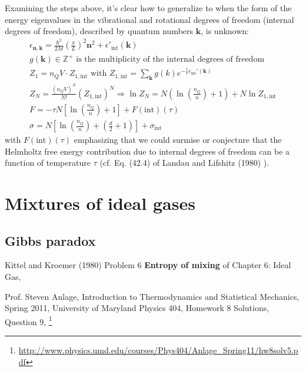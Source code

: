 \documentclass[10pt]{amsart}
\begin{document}
\begin{multicols*}{2}
Examining the steps above, it's clear how to generalize to when the form of the energy eigenvalues in the vibrational and rotational degrees of freedom (internal degrees of freedom), described by quantum numbers $\mathbf{k}$, is unknown:
\[
\begin{gathered}
  \epsilon_{\mathbf{n},\mathbf{k}} = \frac{ \hbar^2}{2M} \left( \frac{\pi}{L} \right)^2 \mathbf{n}^2  + \epsilon'_{\text{int}}(\mathbf{k}) \\
  g(\mathbf{k}) \in \mathbb{Z}^+ \text{ is the multiplicity of the internal degrees of freedom } \\ 
  Z_1 = n_Q V \cdot Z_{1,\text{int}} \text{ with } Z_{1,\text{int}} = \sum_{\mathbf{k}} g(k) e^{ -\frac{1}{\tau} \epsilon_{\text{int}}'(\mathbf{k}) } \\ 
  Z_N = \frac{ (n_Q V)^N}{N!} (Z_{1,\text{int}})^N  \Longrightarrow \ln{Z_N} = N \left( \ln{ \left( \frac{n_Q}{n} \right) } + 1 \right) + N \ln{ Z_{1,\text{int}} } \\ 
  F = -\tau N \left[ \ln{ \left( \frac{n_Q}{n} \right) + 1 } \right] + F(\text{int})(\tau) \\ 
  \sigma = N \left[ \ln{ \left( \frac{n_Q}{n} \right) } + \left( \frac{d}{2} + 1 \right) \right] + \sigma_{\text{int}}
\end{gathered}
\]
with $F(\text{int})(\tau)$ emphasizing that we could surmise or conjecture that the Helmholtz free energy contribution due to internal degrees of freedom can be a function of temperature $\tau$ (cf. Eq. (42.4) of Landau and Lifshitz (1980) \cite{LLandauELifshitz1980}).  



\section{Mixtures of ideal gases}

\subsection{Gibbs paradox}


Kittel and Kroemer (1980) \cite{CKittelHKroemer1980} Problem 6 \textbf{Entropy of mixing} of Chapter 6: Ideal Gas,

Prof. Steven Anlage, Introduction to Thermodynamics and Statistical Mechanics, Spring 2011, University of Maryland Physics 404, Homework 8 Solutions, Question 9, \footnote{\url{http://www.physics.umd.edu/courses/Phys404/Anlage_Spring11/hw8solv5.pdf}}


\end{multicols*}
\end{document}
